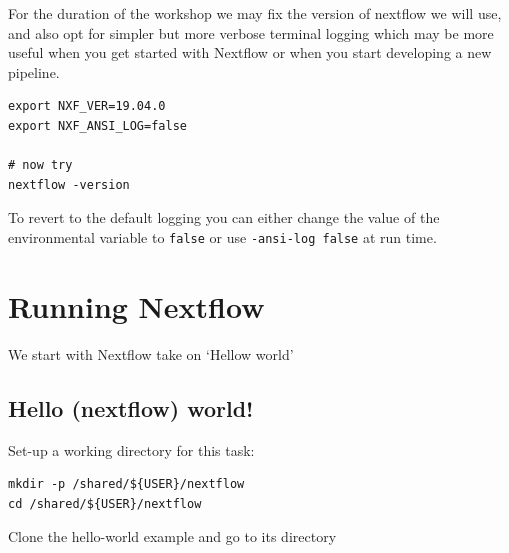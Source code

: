 For the duration of the workshop we may fix the version of nextflow we will use, 
and also opt for simpler but more verbose terminal logging 
which may be more useful when you get started with Nextflow 
or when you start developing a new pipeline.

\begin{steps}
\begin{lstlisting}
export NXF_VER=19.04.0
export NXF_ANSI_LOG=false

# now try
nextflow -version
\end{lstlisting}
\end{steps}

To revert to the default logging you can either change the value of the environmental variable to \texttt{false} or use \texttt{-ansi-log false} at run time.


\newpage


\section{Running Nextflow}

We start with Nextflow take on `Hellow world'%

\subsection{Hello (nextflow) world!}




Set-up a working directory for this task:


\begin{steps}
\begin{lstlisting}
mkdir -p /shared/${USER}/nextflow
cd /shared/${USER}/nextflow
\end{lstlisting}
\end{steps}

Clone the hello-world example and go to its directory


